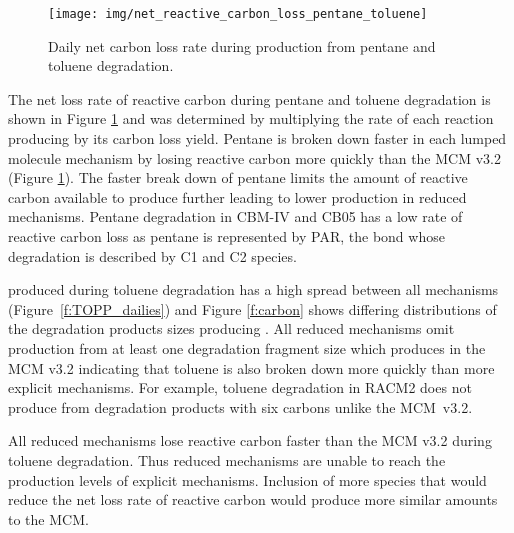 \begin{figure}
    \centering
    \texttt{[image: img/net\_reactive\_carbon\_loss\_pentane\_toluene]}
    \vspace{0mm}
    \caption{Daily net carbon loss rate during  production from pentane and toluene degradation.}
    \vspace{-4mm}
    \label{f:net_carbon_loss}
\end{figure}

The net loss rate of reactive carbon during pentane and toluene degradation is shown in Figure \ref{f:net_carbon_loss} and was determined by multiplying the rate of each reaction producing  by its carbon loss yield.
Pentane is broken down faster in each lumped molecule mechanism by losing reactive carbon more quickly than the MCM v3.2 (Figure \ref{f:net_carbon_loss}).
The faster break down of pentane limits the amount of reactive carbon available to produce further  leading to lower  production in reduced mechanisms.
Pentane degradation in CBM-IV and CB05 has a low rate of reactive carbon loss as pentane is represented by PAR, the  bond whose degradation is described by C1 and C2 species.

 produced during toluene degradation has a high spread between all mechanisms \mbox{(Figure \ref{f:TOPP_dailies})} and Figure \ref{f:carbon} shows differing distributions of the degradation products sizes producing .
All reduced mechanisms omit  production from at least one degradation fragment size which produces  in the MCM v3.2 indicating that toluene is also broken down more quickly than more explicit mechanisms.
For example, toluene degradation in RACM2 does not produce  from degradation products with six carbons unlike the \mbox{MCM v3.2}.

All reduced mechanisms lose reactive carbon faster than the MCM v3.2 during toluene degradation.
Thus reduced mechanisms are unable to reach the  production levels of explicit mechanisms.
Inclusion of more species that would reduce the net loss rate of reactive carbon would produce more similar  amounts to the MCM.
